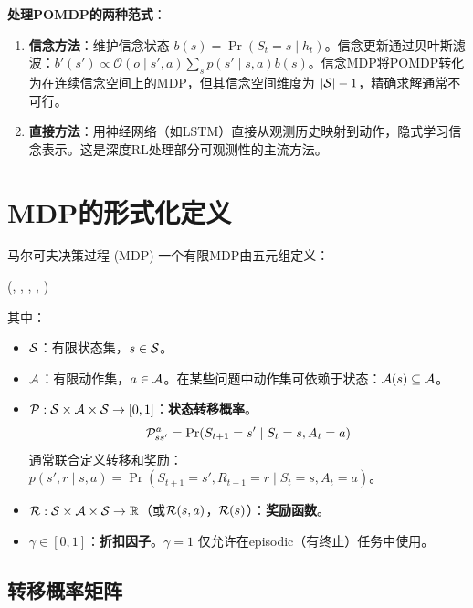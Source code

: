 \textbf{处理POMDP的两种范式}：
\begin{enumerate}
    \item \textbf{信念方法}：维护信念状态 $b(s) = \Pr(S_t = s \mid h_t)$。信念更新通过贝叶斯滤波：$b'(s') \propto \mathcal{O}(o \mid s', a) \sum_s p(s' \mid s, a) b(s)$。信念MDP将POMDP转化为在连续信念空间上的MDP，但其信念空间维度为 $|\mathcal{S}| - 1$，精确求解通常不可行。
    \item \textbf{直接方法}：用神经网络（如LSTM）直接从观测历史映射到动作，隐式学习信念表示。这是深度RL处理部分可观测性的主流方法。
\end{enumerate}

\section{MDP的形式化定义}

\begin{mydefinition}{马尔可夫决策过程 (MDP)}
一个有限MDP由五元组定义：
\begin{myformula}
(\states, \actions, \trans, \reward, \gamma)
\end{myformula}
其中：
\begin{itemize}
    \item $\mathcal{S}$：有限状态集，$s \in \mathcal{S}$。
    \item $\mathcal{A}$：有限动作集，$a \in \mathcal{A}$。在某些问题中动作集可依赖于状态：$\mathcal{A}(s) \subseteq \mathcal{A}$。
    \item $\mathcal{P}: \mathcal{S} \times \mathcal{A} \times \mathcal{S} \to [0, 1]$：\textbf{状态转移概率}。
    \[
    \mathcal{P}_{ss'}^a = \Pr(S_{t+1} = s' \mid S_t = s, A_t = a)
    \]
    通常联合定义转移和奖励：$p(s', r \mid s, a) = \Pr(S_{t+1} = s', R_{t+1} = r \mid S_t = s, A_t = a)$。
    \item $\mathcal{R}: \mathcal{S} \times \mathcal{A} \times \mathcal{S} \to \mathbb{R}$（或$\mathcal{R}(s,a)$，$\mathcal{R}(s)$）：\textbf{奖励函数}。
    \item $\gamma \in [0, 1]$：\textbf{折扣因子}。$\gamma = 1$ 仅允许在episodic（有终止）任务中使用。
\end{itemize}
\end{mydefinition}

\subsection{转移概率矩阵}

